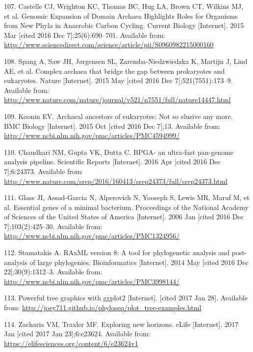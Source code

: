\documentclass[12pt,twoside]{reedthesis}
\begin{document}
  \hypertarget{ref-castelle_genomic_2015}{}
  107. Castelle CJ, Wrighton KC, Thomas BC, Hug LA, Brown CT, Wilkins MJ,
  et al. Genomic Expansion of Domain Archaea Highlights Roles for
  Organisms from New Phyla in Anaerobic Carbon Cycling. Current Biology
  {[}Internet{]}. 2015 Mar {[}cited 2016 Dec 7{]};25(6):690--701.
  Available from:
  \url{http://www.sciencedirect.com/science/article/pii/S0960982215000160}
  
  \hypertarget{ref-spang_complex_2015}{}
  108. Spang A, Saw JH, Jørgensen SL, Zaremba-Niedzwiedzka K, Martijn J,
  Lind AE, et al. Complex archaea that bridge the gap between prokaryotes
  and eukaryotes. Nature {[}Internet{]}. 2015 May {[}cited 2016 Dec
  7{]};521(7551):173--9. Available from:
  \url{http://www.nature.com/nature/journal/v521/n7551/full/nature14447.html}
  
  \hypertarget{ref-koonin_archaeal_2015}{}
  109. Koonin EV. Archaeal ancestors of eukaryotes: Not so elusive any
  more. BMC Biology {[}Internet{]}. 2015 Oct {[}cited 2016 Dec 7{]};13.
  Available from:
  \url{http://www.ncbi.nlm.nih.gov/pmc/articles/PMC4594999/}
  
  \hypertarget{ref-chaudhari_bpga-_2016}{}
  110. Chaudhari NM, Gupta VK, Dutta C. BPGA- an ultra-fast pan-genome
  analysis pipeline. Scientific Reports {[}Internet{]}. 2016 Apr {[}cited
  2016 Dec 7{]};6:24373. Available from:
  \url{http://www.nature.com/srep/2016/160413/srep24373/full/srep24373.html}
  
  \hypertarget{ref-glass_essential_2006}{}
  111. Glass JI, Assad-Garcia N, Alperovich N, Yooseph S, Lewis MR, Maruf
  M, et al. Essential genes of a minimal bacterium. Proceedings of the
  National Academy of Sciences of the United States of America
  {[}Internet{]}. 2006 Jan {[}cited 2016 Dec 7{]};103(2):425--30.
  Available from:
  \url{http://www.ncbi.nlm.nih.gov/pmc/articles/PMC1324956/}
  
  \hypertarget{ref-stamatakis_raxml_2014}{}
  112. Stamatakis A. RAxML version 8: A tool for phylogenetic analysis and
  post-analysis of large phylogenies. Bioinformatics {[}Internet{]}. 2014
  May {[}cited 2016 Dec 22{]};30(9):1312--3. Available from:
  \url{http://www.ncbi.nlm.nih.gov/pmc/articles/PMC3998144/}
  
  \hypertarget{ref-phyloseq_powerful_2016}{}
  113. Powerful tree graphics with ggplot2 {[}Internet{]}. {[}cited 2017
  Jan 28{]}. Available from:
  \url{http://joey711.github.io/phyloseq/plot_tree-examples.html}
  
  \hypertarget{ref-zacharia_exploring_2017}{}
  114. Zacharia VM, Traxler MF. Exploring new horizons. eLife
  {[}Internet{]}. 2017 Jan {[}cited 2017 Jan 23{]};6:e23624. Available
  from: \url{https://elifesciences.org/content/6/e23624v1}
  
\end{document}
